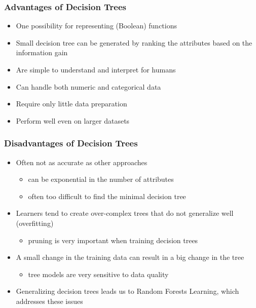 \documentclass[conference]{styles/acmsiggraph}
\begin{document}
        \subsubsection{Advantages of Decision Trees}
            \begin{itemize}
                \item One possibility for representing (Boolean) functions
                \item Small decision tree can be generated by ranking the attributes based on the information gain
                \item Are simple to understand and interpret for humans
                \item Can handle both numeric and categorical data
                \item Require only little data preparation
                \item Perform well even on larger datasets
            \end{itemize}
        
        \subsubsection{Disadvantages of Decision Trees}
            \begin{itemize}
                \item Often not as accurate as other approaches
                \begin{itemize}
                    \item can be exponential in the number of attributes
                    \item often too difficult to find the minimal decision tree
                \end{itemize}
                \item Learners tend to create over-complex trees that do not generalize well (overfitting)
                \begin{itemize}
                    \item pruning is very important when training decision trees
                \end{itemize}
                \item A small change in the training data can result in a big change in the tree
                \begin{itemize}
                    \item tree models are very sensitive to data quality
                \end{itemize}
                \item Generalizing decision trees leads us to Random Forests Learning, which addresses these issues
            \end{itemize}
        
\end{document}
